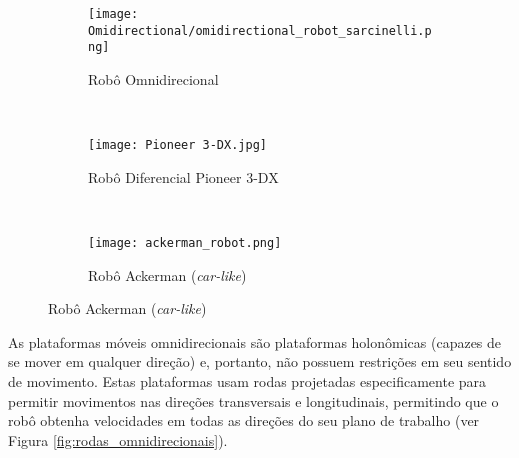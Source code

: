 \begin{figure}[htb]
    \centering
    \caption{Tipos de Robôs Móveis Terrestres.}
    \label{fig:mobile_robot_types}

    \begin{subfigure}[b]{0.3\textwidth}
        \texttt{[image: Omidirectional/omidirectional\_robot\_sarcinelli.png]}
        \caption{Robô Omnidirecional}
    \end{subfigure}
    ~
    \begin{subfigure}[b]{0.3\textwidth}
        \texttt{[image: Pioneer 3-DX.jpg]}
        \caption{Robô Diferencial Pioneer 3-DX}
    \end{subfigure}
    ~
    \begin{subfigure}[b]{0.3\textwidth}
        \texttt{[image: ackerman\_robot.png]}
        \caption{Robô Ackerman (\textit{car-like})}
    \end{subfigure}
    
\end{figure}


%  

As plataformas móveis omnidirecionais são plataformas holonômicas (capazes de se mover em qualquer direção) e, portanto, não possuem restrições em seu sentido de movimento. Estas plataformas usam rodas projetadas especificamente para permitir movimentos nas direções transversais e longitudinais, permitindo que o robô obtenha velocidades em todas as direções do seu plano de trabalho (ver Figura \ref{fig:rodas_omnidirecionais}).

